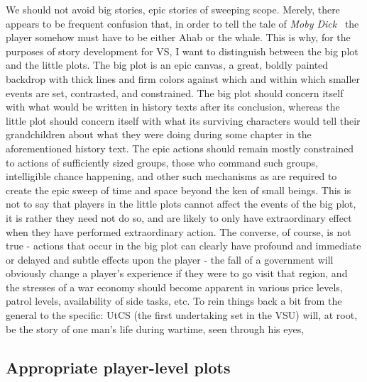We should not avoid big stories, epic stories of sweeping scope. Merely,
there appears to be frequent confusion that, in order to tell the tale
of \emph{Moby Dick}~\cite{MobyDick} the player somehow must have to be either
Ahab or the whale. This is why, for the purposes of story development
for VS, I want to distinguish between the big plot and the little
plots. The big plot is an epic canvas, a great, boldly painted
backdrop with thick lines and firm colors against which and within
which smaller events are set, contrasted, and constrained. The big
plot should concern itself with what would be written in history texts
after its conclusion, whereas the little plot should concern itself
with what its surviving characters would tell their grandchildren
about what they were doing during some chapter in the aforementioned
history text. The epic actions should remain mostly constrained to
actions of sufficiently sized groups, those who command such groups,
intelligible chance happening, and other such mechanisms as are
required to create the epic sweep of time and space beyond the ken of
small beings. This is not to say that players in the little plots
cannot affect the events of the big plot, it is rather they need not
do so, and are likely to only have extraordinary effect when they have
performed extraordinary action. The converse, of course, is not true -
actions that occur in the big plot can clearly have profound and
immediate or delayed and subtle effects upon the player - the fall of
a government will obviously change a player's experience if they were
to go visit that region, and the stresses of a war economy should
become apparent in various price levels, patrol levels, availability of
side tasks, etc. To rein things back a bit from the general to the
specific: UtCS (the first undertaking set in the VSU) will, at root, be the story of one man's life during
wartime, seen through his eyes,

\subsection{Appropriate player-level plots}

